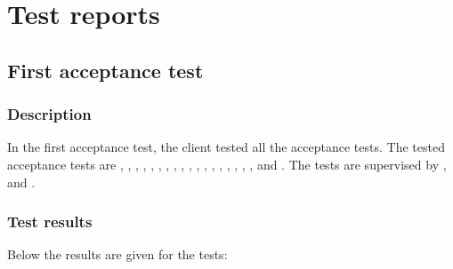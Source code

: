 \chapter{Test reports}
\label{chap:testReports}

\section{First acceptance test}
\subsection{Description}

In the first acceptance test, the client tested all the acceptance tests. The  tested acceptance tests are , , , , , , , , , , , , , , , , , ,  and . The tests are supervised by \lasse{}, \roel{} and \thom{}.

\subsection{Test results}

Below the results are given for the tests:

